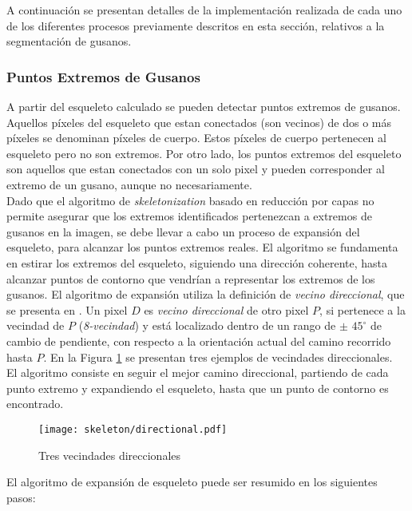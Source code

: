 A continuaci\'on se presentan detalles de la implementaci\'on realizada
de cada uno de los diferentes procesos previamente descritos en esta secci\'on, 
relativos a la segmentaci\'on de gusanos.

\subsubsection*{Puntos Extremos de Gusanos}
\label{sec:wend}

A partir del esqueleto calculado se pueden detectar puntos extremos 
de gusanos. Aquellos p\'ixeles del esqueleto que estan conectados
(son vecinos) de dos o m\'as p\'ixeles se denominan p\'ixeles de cuerpo.
Estos p\'ixeles de cuerpo pertenecen al esqueleto pero no son extremos.
Por otro lado, los puntos extremos del esqueleto son aquellos que estan conectados con
un solo pixel y pueden corresponder al extremo de un gusano, aunque no
necesariamente.\\

Dado que el algoritmo de \emph{skeletonization} basado en reducci\'on por capas
no permite asegurar que los extremos identificados pertenezcan a extremos
de gusanos en la imagen, se debe llevar a cabo un proceso de expansi\'on
del esqueleto, para alcanzar los puntos extremos reales.
El algoritmo se fundamenta en estirar los extremos del esqueleto, siguiendo
una direcci\'on coherente, hasta alcanzar puntos de contorno que vendr\'ian a 
representar los extremos de los gusanos. El algoritmo de expansi\'on utiliza
la definici\'on de \emph{vecino direccional}, que se presenta en \cite[p.334]{maxima}.
Un pixel $D$ es \emph{vecino direccional} de otro pixel $P$, si pertenece a
la vecindad de $P$ (\emph{8-vecindad}) y est\'a localizado dentro de un rango de 
$\pm$ $45^{\circ}$  de cambio de pendiente, con respecto a la orientaci\'on actual
del camino recorrido hasta $P$. En la Figura \ref{fig:directional} se presentan 
tres ejemplos de vecindades direccionales.\\
El algoritmo consiste en seguir el mejor camino direccional, partiendo de cada
punto extremo y expandiendo el esqueleto, hasta que un punto de contorno es
encontrado.
 
\begin{figure}[h t b p ! H]
 \centering
   \texttt{[image: skeleton/directional.pdf]}
 \caption{Tres vecindades direccionales}
 \label{fig:directional}
\end{figure}

El algoritmo de expansi\'on de esqueleto puede ser resumido en 
los siguientes pasos:

